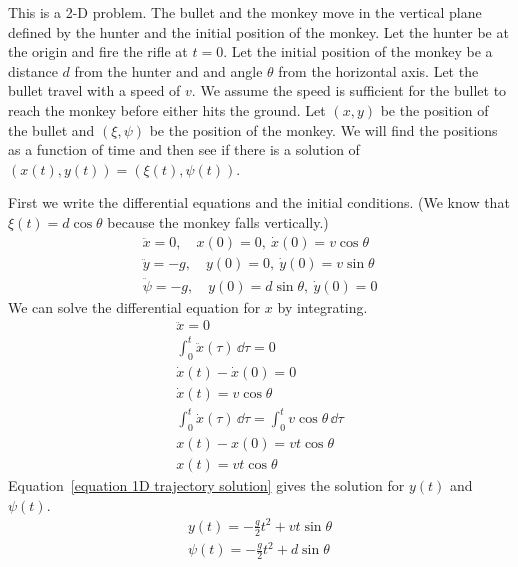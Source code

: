 {\begin{Solution}
  \label{solution hunter monkey}
  This is a 2-D problem.  The bullet and the monkey move in the vertical 
  plane defined by the hunter and the initial position of the monkey.  Let 
  the hunter be at the origin and fire the rifle at $t = 0$.  Let the 
  initial position of the monkey be a distance $d$ from the hunter and
  and angle $\theta$ from the horizontal axis.  Let the bullet travel with 
  a speed of $v$.  We assume the speed is sufficient for the bullet to 
  reach the monkey before either hits the ground.  Let $(x,y)$ be the
  position of the bullet and $(\xi,\psi)$ be the position of the monkey.
  We will find the positions as a function of time and then see if there
  is a solution of $(x(t), y(t)) = (\xi(t), \psi(t))$.

  First we write the differential equations and the initial conditions.
  (We know that $\xi(t) = d \cos \theta$ because the monkey falls vertically.)
  \begin{gather*}
    \ddot{x} = 0, \quad x(0) = 0,\ \dot{x}(0) = v \cos \theta
    \\
    \ddot{y} = - g, \quad y(0) = 0,\ \dot{y}(0) = v \sin \theta
    \\
    \ddot{\psi} = - g, \quad y(0) = d \sin \theta,\ \dot{y}(0) = 0
  \end{gather*}
  We can solve the differential equation for $x$ by integrating.
  \begin{gather*}
    \ddot{x} = 0
    \\
    \int_0^t \ddot{x}(\tau) \,\dd \tau = 0
    \\
    \dot{x}(t) - \dot{x}(0) = 0
    \\
    \dot{x}(t) = v \cos \theta
    \\
    \int_0^t \dot{x}(\tau) \,\dd \tau = \int_0^t v \cos \theta \,\dd \tau
    \\
    x(t) - x(0) = v t \cos \theta
    \\ 
    x(t) = v t \cos \theta
  \end{gather*}
  Equation~\ref{equation 1D trajectory solution} gives the solution for
  $y(t)$ and $\psi(t)$.
  \begin{gather*}
    y(t) = - \frac{g}{2} t^2 + v t \sin \theta
    \\
    \psi(t) = - \frac{g}{2} t^2 + d \sin \theta
  \end{gather*}


\end{Solution}}
